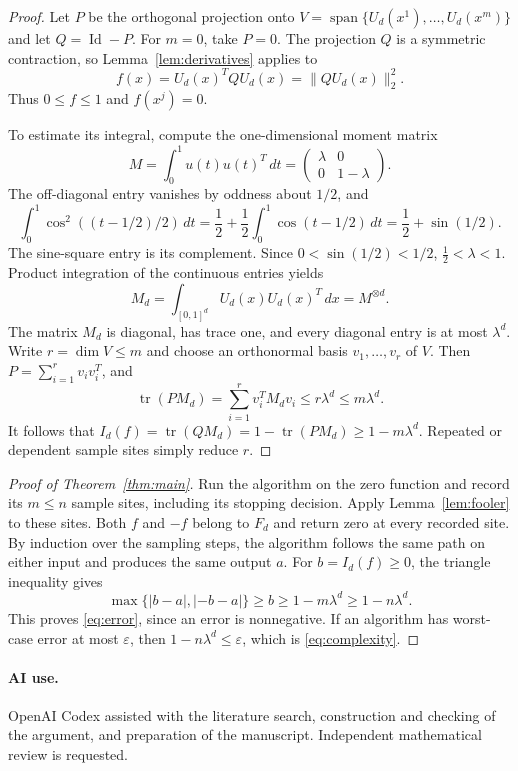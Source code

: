 \documentclass[11pt]{article}
\newcommand{\tr}{\operatorname{tr}}
\newcommand{\Id}{\operatorname{Id}}
\begin{document}
\begin{proof}
Let $P$ be the orthogonal projection onto
$V=\operatorname{span}\{U_d(x^1),\ldots,U_d(x^m)\}$ and let $Q=\Id-P$.
For $m=0$, take $P=0$. The projection $Q$ is a symmetric contraction, so
Lemma~\ref{lem:derivatives} applies to
\[
 f(x)=U_d(x)^TQ U_d(x)=\|Q U_d(x)\|_2^2.
\]
Thus $0\le f\le1$ and $f(x^j)=0$.

To estimate its integral, compute the one-dimensional moment matrix
\begin{equation}\label{eq:moment}
 M=\int_0^1u(t)u(t)^T\,dt
 =\begin{pmatrix}\lambda&0\\0&1-\lambda\end{pmatrix}.
\end{equation}
The off-diagonal entry vanishes by oddness about $1/2$, and
\[
 \int_0^1\cos^2((t-1/2)/2)\,dt
 =\frac12+\frac12\int_0^1\cos(t-1/2)\,dt
 =\frac12+\sin(1/2).
\]
The sine-square entry is its complement. Since $0<\sin(1/2)<1/2$,
$\tfrac12<\lambda<1$. Product integration of the continuous entries yields
\[
 M_d=\int_{[0,1]^d}U_d(x)U_d(x)^T\,dx=M^{\otimes d}.
\]
The matrix $M_d$ is diagonal, has trace one, and every diagonal entry is
at most $\lambda^d$. Write $r=\dim V\le m$ and choose an orthonormal
basis $v_1,\ldots,v_r$ of $V$. Then $P=\sum_{i=1}^r v_i v_i^T$, and
\[
 \tr(PM_d)=\sum_{i=1}^r v_i^T M_d v_i\le r\lambda^d\le m\lambda^d.
\]
It follows that
$I_d(f)=\tr(QM_d)=1-\tr(PM_d)\ge1-m\lambda^d$.
Repeated or dependent sample sites simply reduce $r$.
\end{proof}

\begin{proof}[Proof of Theorem~\ref{thm:main}]
Run the algorithm on the zero function and record its $m\le n$ sample
sites, including its stopping decision. Apply Lemma~\ref{lem:fooler} to
these sites. Both $f$ and $-f$ belong to $F_d$ and return zero at every
recorded site. By induction over the sampling steps, the algorithm follows
the same path on either input and produces the same output $a$.
For $b=I_d(f)\ge0$, the triangle inequality gives
\[
 \max\{|b-a|,|-b-a|\}\ge b\ge1-m\lambda^d\ge1-n\lambda^d.
\]
This proves \eqref{eq:error}, since an error is nonnegative. If an
algorithm has worst-case error at most $\varepsilon$, then
$1-n\lambda^d\le\varepsilon$, which is \eqref{eq:complexity}.
\end{proof}

\paragraph{AI use.}
OpenAI Codex assisted with the literature search, construction and checking
of the argument, and preparation of the manuscript. Independent
mathematical review is requested.
\end{document}
